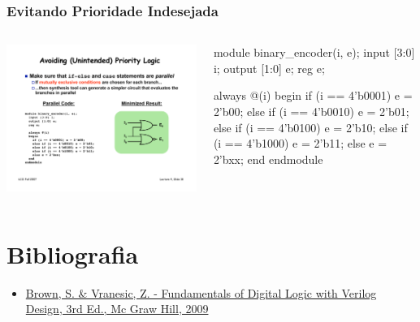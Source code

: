 \begin{frame}[fragile]
	\frametitle{Evitando Prioridade Indesejada}
	\begin{columns}
        \includegraphics[scale=.5]{figs/Encoder4to2Min}
    	\begin{verilogcode}
module binary_encoder(i, e); 
  input [3:0] i;
  output [1:0] e;
  reg e;
 
  always @(i)
  begin
    if (i == 4'b0001) 
      e = 2'b00; 
    else if (i == 4'b0010) 
      e = 2'b01; 
    else if (i == 4'b0100) 
      e = 2'b10; 
    else if (i == 4'b1000) 
      e = 2'b11; 
    else 
      e = 2'bxx;
  end
endmodule
        \end{verilogcode}
    \end{columns}
\end{frame}


\section{Bibliografia} %

\begin{frame}{\insertsection} 
	\begin{itemize}
		\item \href{https://www.google.com.br/search?q=filetype\%3Apdf+Fundamentals+of+Digital+Logic+with+Verilog+Design+&oq=filetype\%3Apdf}{Brown, S. \& Vranesic, Z. - Fundamentals of Digital Logic with Verilog Design, 3rd Ed., Mc Graw Hill, 2009}
	\end{itemize}
\end{frame}

\begin{frame}
	\titlepage
\end{frame} 

